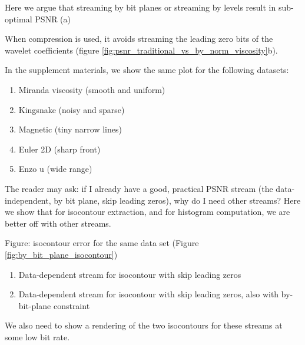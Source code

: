 Here we argue that streaming by bit planes or streaming by levels result in sub-optimal PSNR (a)


When compression is used, it avoids streaming the leading zero bits of the wavelet coefficients (figure \ref{fig:psnr_traditional_vs_by_norm_viscosity}b).

In the supplement materials, we show the same plot for the following datasets:
\begin{enumerate}
  \item Miranda viscosity (smooth and uniform)
  \item Kingsnake (noisy and sparse)
  \item Magnetic (tiny narrow lines)
  \item Euler 2D (sharp front)
  \item Enzo u (wide range)
\end{enumerate}

The reader may ask: if I already have a good, practical PSNR stream (the data-independent, by bit plane, skip leading zeros), why do I need other streams? Here we show that for isocontour extraction, and for histogram computation, we are better off with other streams.
  
Figure: isocontour error for the same data set (Figure \ref{fig:by_bit_plane_isocontour})
\begin{enumerate}
  \item Data-dependent stream for isocontour with skip leading zeros
  \item Data-dependent stream for isocontour with skip leading zeros, also with by-bit-plane constraint
\end{enumerate}

We also need to show a rendering of the two isocontours for these streams at some low bit rate.


